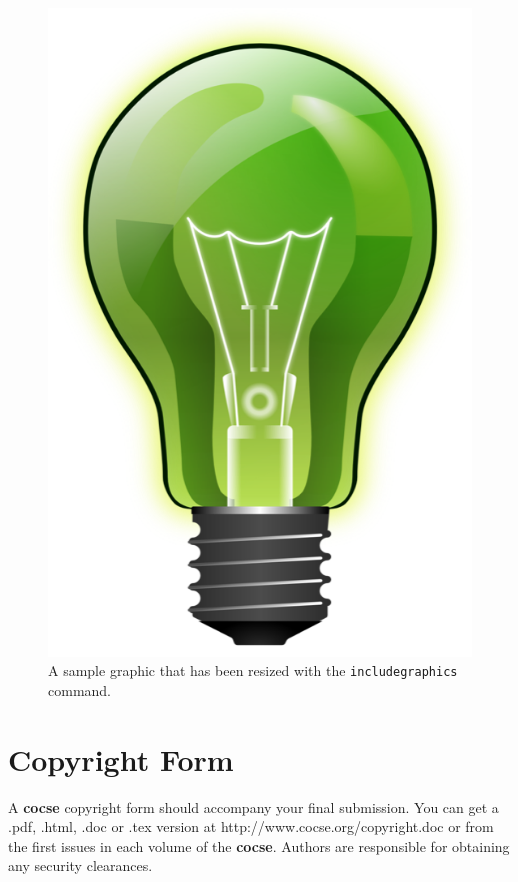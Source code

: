 \documentclass{cocseArticle}
\begin{document}
\begin{figure}
	\centering
	\includegraphics[scale=0.3]{images/green_light_bulb}
	\caption{A sample graphic
		that has been resized with the \texttt{includegraphics} command.}
\end{figure}

\section{Copyright Form}
A \textbf{cocse} copyright form should accompany your final submission. You can get a .pdf, .html, .doc or .tex version at http://www.cocse.org/copyright.doc or from the first issues in each volume of the \textbf{cocse}. Authors are responsible for obtaining any security clearances.
\end{document}
